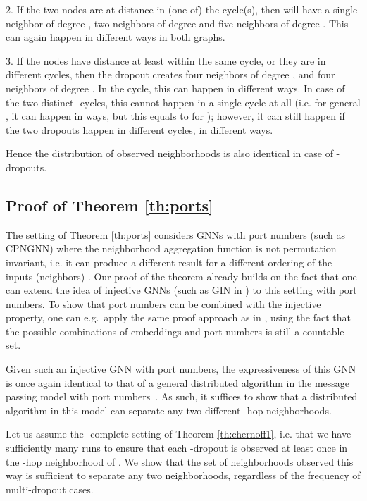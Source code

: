 \documentclass{article}
\begin{document}
2. If the two nodes are at distance  in (one of) the cycle(s), then  will have a single neighbor of degree , two neighbors of degree  and five neighbors of degree . This can again happen in  different ways in both graphs.

3. If the nodes have distance at least  within the same cycle, or they are in different cycles, then the dropout creates four neighbors of degree , and four neighbors of degree . In the  cycle, this can happen in  different ways. In case of the two distinct -cycles, this cannot happen in a single cycle at all (i.e. for general , it can happen in  ways, but this equals to  for ); however, it can still happen if the two dropouts happen in different cycles, in  different ways.

Hence the distribution of observed neighborhoods is also identical in case of -dropouts.

\subsection{Proof of Theorem \ref{th:ports}}

The setting of Theorem \ref{th:ports} considers GNNs with port numbers (such as CPNGNN) where the neighborhood aggregation function is not permutation invariant, i.e. it can produce a different result for a different ordering of the inputs (neighbors) \citep{ports}. Our proof of the theorem already builds on the fact that one can extend the idea of injective GNNs (such as GIN in \citep{GIN}) to this setting with port numbers. To show that port numbers can be combined with the injective property, one can e.g.\ apply the same proof approach as in \citep{GIN}, using the fact that the possible combinations of embeddings and port numbers is still a countable set.

Given such an injective GNN with port numbers, the expressiveness of this GNN is once again identical to that of a general distributed algorithm in the message passing model with port numbers~\citep{ports}. As such, it suffices to show that a distributed algorithm in this model can separate any two different -hop neighborhoods.

Let us assume the -complete setting of Theorem \ref{th:chernoff1}, i.e. that we have sufficiently many runs to ensure that each -dropout is observed at least once in the -hop neighborhood of . We show that the set of neighborhoods observed this way is sufficient to separate any two neighborhoods, regardless of the frequency of multi-dropout cases.
\end{document}
